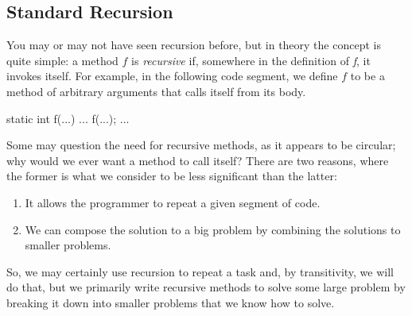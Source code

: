 \subsection*{Standard Recursion}
You may or may not have seen recursion before, but in theory the concept is quite simple: a method $f$ is \textit{recursive} if, somewhere in the definition of \textit{f}, it invokes itself. For example, in the following code segment, we define $f$ to be a method of arbitrary arguments that calls itself from its body. 
\begin{verbnobox}[\small]
static int f(...) {
  ...
  f(...);
  ...
}
\end{verbnobox}
Some may question the need for recursive methods, as it appears to be circular; why would we ever want a method to call itself? There are two reasons, where the former is what we consider to be less significant than the latter:
\begin{enumerate}
    \item It allows the programmer to repeat a given segment of code.
    \item We can compose the solution to a big problem by combining the solutions to smaller problems.
\end{enumerate}
So, we may certainly use recursion to repeat a task and, by transitivity, we will do that, but we primarily write recursive methods to solve some large problem by breaking it down into smaller problems that we know how to solve.

